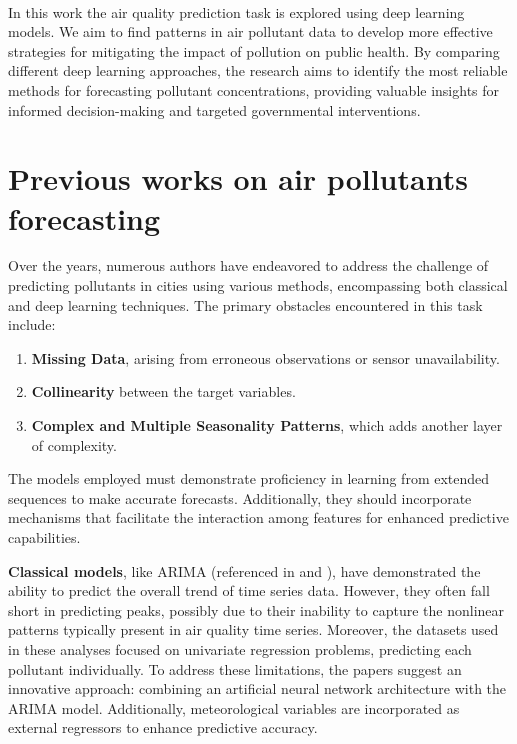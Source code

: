 \paragraph{}

In this work the air quality prediction task is explored using deep learning models. We aim to find patterns in air pollutant data to develop more effective strategies for mitigating the impact of pollution on public health. By comparing different deep learning approaches, the research aims to identify the most reliable methods for forecasting pollutant concentrations, providing valuable insights for informed decision-making and targeted governmental interventions.

\section{Previous works on air pollutants forecasting}
\label{cap1:sota}
Over the years, numerous authors have endeavored to address the challenge of predicting pollutants in cities using various methods, encompassing both classical and deep learning techniques. The primary obstacles encountered in this task include:

\begin{enumerate}
  \item \textbf{Missing Data}, arising from erroneous observations or sensor unavailability.
  \item \textbf{Collinearity} between the target variables.
  \item \textbf{Complex and Multiple Seasonality Patterns}, which adds another layer of complexity.
\end{enumerate}

The models employed must demonstrate proficiency in learning from extended sequences to make accurate forecasts. Additionally, they should incorporate mechanisms that facilitate the interaction among features for enhanced predictive capabilities.

\textbf{Classical models}, like ARIMA (referenced in \cite{DIAZROBLES20088331} and \cite{Jodar2013}), have demonstrated the ability to predict the overall trend of time series data. However, they often fall short in predicting peaks, possibly due to their inability to capture the nonlinear patterns typically present in air quality time series. Moreover, the datasets used in these analyses focused on univariate regression problems, predicting each pollutant individually. To address these limitations, the papers suggest an innovative approach: combining an artificial neural network architecture with the ARIMA model. Additionally, meteorological variables are incorporated as external regressors to enhance predictive accuracy.\\ 

